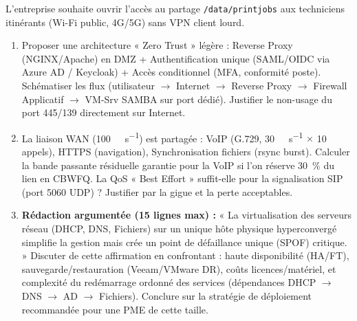 \documentclass[11pt]{article}
\begin{document}
\begin{exercice}
L'entreprise souhaite ouvrir l'accès au partage \texttt{/data/printjobs} aux techniciens itinérants (Wi-Fi public, 4G/5G) sans VPN client lourd.

\begin{enumerate}
    \item Proposer une architecture « Zero Trust » légère : Reverse Proxy (NGINX/Apache) en DMZ + Authentification unique (SAML/OIDC via Azure AD / Keycloak) + Accès conditionnel (MFA, conformité poste). Schématiser les flux (utilisateur $\to$ Internet $\to$ Reverse Proxy $\to$ Firewall Applicatif $\to$ VM-Srv SAMBA sur port dédié). Justifier le non-usage du port 445/139 directement sur Internet.
    \item La liaison WAN (\SI{100}{\mega\bit\per\second}) est partagée : VoIP (G.729, \SI{30}{\kilo\bit\per\second} $\times$ 10 appels), HTTPS (navigation), Synchronisation fichiers (rsync burst). Calculer la bande passante résiduelle garantie pour la VoIP si l'on réserve \SI{30}{\percent} du lien en CBWFQ. La QoS « Best Effort » suffit-elle pour la signalisation SIP (port 5060 UDP) ? Justifier par la gigue et la perte acceptables.
    \item \textbf{Rédaction argumentée (15 lignes max) :} « La virtualisation des serveurs réseau (DHCP, DNS, Fichiers) sur un unique hôte physique hyperconvergé simplifie la gestion mais crée un point de défaillance unique (SPOF) critique. » Discuter de cette affirmation en confrontant : haute disponibilité (HA/FT), sauvegarde/restauration (Veeam/VMware DR), coûts licences/matériel, et complexité du redémarrage ordonné des services (dépendances DHCP $\to$ DNS $\to$ AD $\to$ Fichiers). Conclure sur la stratégie de déploiement recommandée pour une PME de cette taille.
\end{enumerate}
\end{exercice}
\end{document}
